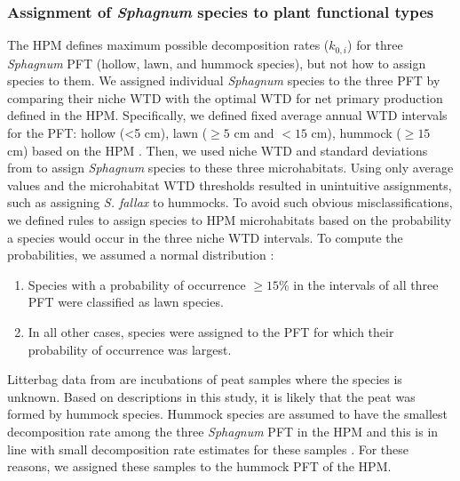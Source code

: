 \documentclass[esd, manuscript]{copernicus}
\begin{document}
\hypertarget{sdm-003-methods-4}{%
\subsubsection{\texorpdfstring{Assignment of \emph{Sphagnum} species to plant functional types}{Assignment of Sphagnum species to plant functional types}}\label{sdm-003-methods-4}}

The HPM defines maximum possible decomposition rates (\(k_{0,i}\)) for three \emph{Sphagnum} PFT (hollow, lawn, and hummock species), but not how to assign species to them. We assigned individual \emph{Sphagnum} species to the three PFT by comparing their niche WTD with the optimal WTD for net primary production defined in the HPM. Specifically, we defined fixed average annual WTD intervals for the PFT: hollow (\textless5 cm), lawn (\(\ge5\) cm and \(<15\) cm), hummock (\(\ge15\) cm) based on the HPM \citep{Frolking.2010}. Then, we used niche WTD and standard deviations from \citet{Johnson.2015} to assign \emph{Sphagnum} species to these three microhabitats. Using only average values and the microhabitat WTD thresholds resulted in unintuitive assignments, such as assigning \emph{S. fallax} to hummocks. To avoid such obvious misclassifications, we defined rules to assign species to HPM microhabitats based on the probability a species would occur in the three niche WTD intervals. To compute the probabilities, we assumed a normal distribution \citep{Johnson.2015}:

\begin{enumerate}
\def\labelenumi{\arabic{enumi}.}
\item
  Species with a probability of occurrence \(\ge15\)\% in the intervals of all three PFT were classified as lawn species.
\item
  In all other cases, species were assigned to the PFT for which their probability of occurrence was largest.
\end{enumerate}

Litterbag data from \citet{Prevost.1997} are incubations of peat samples where the species is unknown. Based on descriptions in this study, it is likely that the peat was formed by hummock species. Hummock species are assumed to have the smallest decomposition rate among the three \emph{Sphagnum} PFT in the HPM \citep{Frolking.2010} and this is in line with small decomposition rate estimates for these samples \citep{Teickner.2025}. For these reasons, we assigned these samples to the hummock PFT of the HPM.
\end{document}

